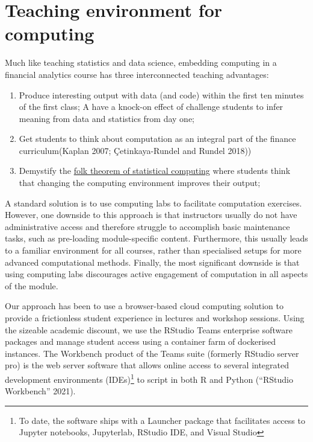 \documentclass{article}
\begin{document}
\hypertarget{teaching-environment-for-computing}{%
\section{Teaching environment for
computing}\label{teaching-environment-for-computing}}

Much like teaching statistics and data science, embedding computing in a
financial analytics course has three interconnected teaching advantages:

\begin{enumerate}
\def\labelenumi{\arabic{enumi}.}
\tightlist
\item
  Produce interesting output with data (and code) within the first ten
  minutes of the first class; A have a knock-on effect of challenge
  students to infer meaning from data and statistics from day one;
\item
  Get students to think about computation as an integral part of the
  finance curriculum(Kaplan 2007; Çetinkaya-Rundel and Rundel 2018))
\item
  Demystify the
  \href{https://statmodeling.stat.columbia.edu/2008/05/13/the_folk_theore/}{folk
  theorem of statistical computing} where students think that changing
  the computing environment improves their output;
\end{enumerate}

A standard solution is to use computing labs to facilitate computation
exercises. However, one downside to this approach is that instructors
usually do not have administrative access and therefore struggle to
accomplish basic maintenance tasks, such as pre-loading module-specific
content. Furthermore, this usually leads to a familiar environment for
all courses, rather than specialised setups for more advanced
computational methods. Finally, the most significant downside is that
using computing labs discourages active engagement of computation in all
aspects of the module.

Our approach has been to use a browser-based cloud computing solution to
provide a frictionless student experience in lectures and workshop
sessions. Using the sizeable academic discount, we use the RStudio Teams
enterprise software packages and manage student access using a container
farm of dockerised instances. The Workbench product of the Teams suite
(formerly RStudio server pro) is the web server software that allows
online access to several integrated development environments
(IDEs)\footnote{To date, the software ships with a Launcher package that
  facilitates access to Jupyter notebooks, Jupyterlab, RStudio IDE, and
  Visual Studio} to script in both R and Python (``RStudio Workbench''
2021).
\end{document}
